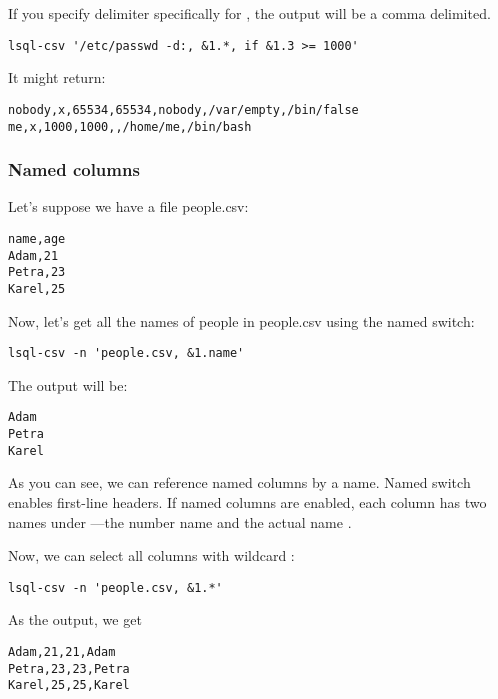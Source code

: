 If you specify delimiter specifically for , the output will be a comma delimited.
\begin{verbatim}
lsql-csv '/etc/passwd -d:, &1.*, if &1.3 >= 1000'
\end{verbatim}
It might return:
\begin{verbatim}
nobody,x,65534,65534,nobody,/var/empty,/bin/false
me,x,1000,1000,,/home/me,/bin/bash
\end{verbatim}


\subsubsection{Named columns}
Let's suppose we have a file people.csv:
\begin{verbatim}
name,age                                                                                                                                                                                                                                   
Adam,21                                                                                                                                                                                                                                    
Petra,23                                                                                                                                                                                                                                   
Karel,25
\end{verbatim}

Now, let's get all the names of people in people.csv using the  named switch:
\begin{verbatim}
lsql-csv -n 'people.csv, &1.name'
\end{verbatim}
The output will be:
\begin{verbatim}
Adam
Petra
Karel
\end{verbatim}

As you can see, we can reference named columns by a name. Named switch  enables first-line headers.
If named columns are enabled, each column has two names under ---the number name  and the actual name .

Now, we can select all columns with wildcard :
\begin{verbatim}
lsql-csv -n 'people.csv, &1.*'
\end{verbatim}
As the output, we get
\begin{verbatim}
Adam,21,21,Adam
Petra,23,23,Petra
Karel,25,25,Karel
\end{verbatim}

